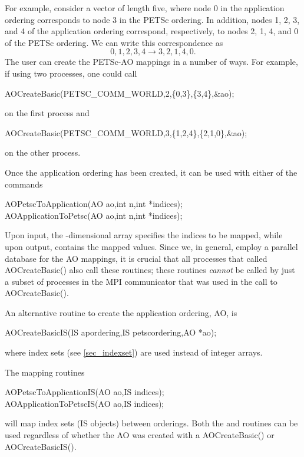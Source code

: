For example, consider a vector of length five, where node 0 in the application ordering
corresponds to node 3 in the PETSc ordering.  In addition, nodes 1, 2, 3, and 4 of
the application ordering correspond, respectively, to nodes 2, 1, 4, and 0 of
the PETSc ordering.
We can write this correspondence as
\[
 { 0, 1, 2, 3, 4 }  \to  { 3, 2, 1, 4, 0 }.
\]
The user can create the PETSc-AO mappings in a number of ways.  For example,
if using two processes, one could call
\begin{tabbing}
  AOCreateBasic(PETSC\_COMM\_WORLD,2,\{0,3\},\{3,4\},\&ao);
\end{tabbing}
on the first process and
\begin{tabbing}
 AOCreateBasic(PETSC\_COMM\_WORLD,3,\{1,2,4\},\{2,1,0\},\&ao);
\end{tabbing}
on the other process.

Once the application ordering has been created, it can be used
with either of the commands
\begin{tabbing}
  AOPetscToApplication(AO ao,int n,int *indices);\\
  AOApplicationToPetsc(AO ao,int n,int *indices);
\end{tabbing}
Upon input, the -dimensional array  specifies
the indices to be mapped, while upon output,  contains
the mapped values.
Since we, in general, employ a parallel database for the
AO mappings, it is crucial that all processes that
called AOCreateBasic() also call these routines; these
routines {\em cannot} be called by just a subset of processes
in the MPI communicator that was used in the call to AOCreateBasic().

An alternative routine to create the application ordering, AO, is
\begin{tabbing}
  AOCreateBasicIS(IS apordering,IS petscordering,AO *ao);
\end{tabbing}
where index sets (see \ref{sec_indexset}) are used instead of integer arrays.

The
mapping routines
\begin{tabbing}
  AOPetscToApplicationIS(AO ao,IS indices);\\
  AOApplicationToPetscIS(AO ao,IS indices);
\end{tabbing}
will map index sets (IS objects) between orderings. Both the  and
 routines can be used regardless of whether the AO was
created with a AOCreateBasic() or AOCreateBasicIS().

